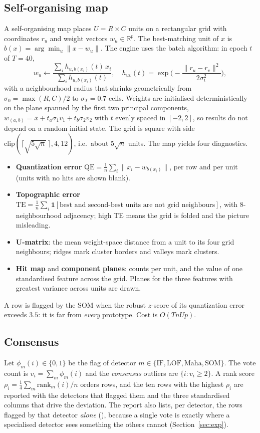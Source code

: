 \documentclass[conference]{IEEEtran}
\begin{document}
\subsection{Self-organising map}
A self-organising map \cite{kohonen1982,kohonen2001} places $U=R\times C$ units on a rectangular grid with coordinates $r_u$ and weight vectors $w_u\in\mathbb R^p$. The best-matching unit of $x$ is $b(x)=\arg\min_u\|x-w_u\|$. The engine uses the batch algorithm: in epoch $t$ of $T=40$,
\begin{equation}w_u\leftarrow\frac{\sum_ih_{u,b(x_i)}(t)\,x_i}{\sum_ih_{u,b(x_i)}(t)},\quad h_{uv}(t)=\exp\!\Big(-\frac{\|r_u-r_v\|^2}{2\sigma_t^2}\Big),\end{equation}
with a neighbourhood radius that shrinks geometrically from $\sigma_0=\max(R,C)/2$ to $\sigma_T=0.7$ cells. Weights are initialised deterministically on the plane spanned by the first two principal components, $w_{(a,b)}=\bar x+t_a\sigma_1v_1+t_b\sigma_2v_2$ with $t$ evenly spaced in $[-2,2]$, so results do not depend on a random initial state. The grid is square with side $\mathrm{clip}(\lceil\sqrt{5\sqrt n}\,\rceil,4,12)$, i.e.\ about $5\sqrt n$ units. The map yields four diagnostics.
\begin{itemize}
\item \textbf{Quantization error} $\mathrm{QE}=\tfrac1n\sum_i\|x_i-w_{b(x_i)}\|$, per row and per unit (units with no hits are shown blank).
\item \textbf{Topographic error} $\mathrm{TE}=\tfrac1n\sum_i\mathbf 1[\text{best and second-best units are not grid neighbours}]$, with $8$-neighbourhood adjacency; high TE means the grid is folded and the picture misleading.
\item \textbf{U-matrix}: the mean weight-space distance from a unit to its four grid neighbours; ridges mark cluster borders and valleys mark clusters.
\item \textbf{Hit map} and \textbf{component planes}: counts per unit, and the value of one standardised feature across the grid. Planes for the three features with greatest variance across units are drawn.
\end{itemize}
A row is flagged by the SOM when the robust $z$-score of its quantization error exceeds $3.5$: it is far from \emph{every} prototype. Cost is $O(TnUp)$.

\subsection{Consensus}
Let $\phi_m(i)\in\{0,1\}$ be the flag of detector $m\in\{\text{IF},\text{LOF},\text{Maha},\text{SOM}\}$. The vote count is $v_i=\sum_m\phi_m(i)$ and the \emph{consensus} outliers are $\{i:v_i\ge2\}$. A rank score $\rho_i=\tfrac14\sum_m\mathrm{rank}_m(i)/n$ orders rows, and the ten rows with the highest $\rho_i$ are reported with the detectors that flagged them and the three standardised columns that drive the deviation. The report also lists, per detector, the rows flagged by that detector \emph{alone} (), because a single vote is exactly where a specialised detector sees something the others cannot (Section~\ref{sec:exp}).
\end{document}
